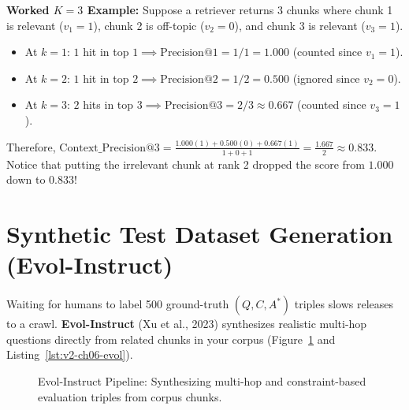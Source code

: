 \textbf{Worked $K=3$ Example:} Suppose a retriever returns 3 chunks where chunk 1 is relevant ($v_1=1$), chunk 2 is off-topic ($v_2=0$), and chunk 3 is relevant ($v_3=1$).
\begin{itemize}[leftmargin=18pt]
  \item At $k=1$: $1$ hit in top $1 \implies \text{Precision@1} = 1/1 = 1.000$ (counted since $v_1=1$).
  \item At $k=2$: $1$ hit in top $2 \implies \text{Precision@2} = 1/2 = 0.500$ (ignored since $v_2=0$).
  \item At $k=3$: $2$ hits in top $3 \implies \text{Precision@3} = 2/3 \approx 0.667$ (counted since $v_3=1$).
\end{itemize}
Therefore, $\text{Context\_Precision@3} = \frac{1.000(1) + 0.500(0) + 0.667(1)}{1 + 0 + 1} = \frac{1.667}{2} \approx \mathbf{0.833}$. Notice that putting the irrelevant chunk at rank 2 dropped the score from $1.000$ down to $0.833$!

\section{Synthetic Test Dataset Generation (Evol-Instruct)}

Waiting for humans to label 500 ground-truth $(Q, C, A^*)$ triples slows releases to a crawl. \textbf{Evol-Instruct} (Xu et al., 2023) synthesizes realistic multi-hop questions directly from related chunks in your corpus (Figure~\ref{fig:v2-ch06-evol} and Listing~\ref{lst:v2-ch06-evol}).

\begin{figure}[htbp]
\centering
{}
\caption{Evol-Instruct Pipeline: Synthesizing multi-hop and constraint-based evaluation triples from corpus chunks.}
\label{fig:v2-ch06-evol}
\end{figure}

